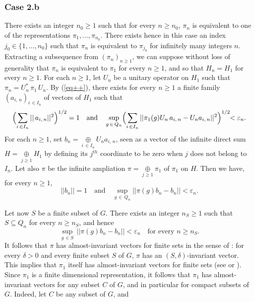 \documentclass[11pt,english,a4paper]{smfart}
\numberwithin{equation}{section}
\theoremstyle{definition}
\begin{document}
\subsubsection{Case 2.b}\label{Section 6.6.2} There exists an integer 
$n_{0}\ge 1$ such that for every 
 $n\ge n_{0}$, $\pi _{n}$ is equivalent to one of the representations
 $\pi _{1},\dots,\pi _{n_{0}}$. There exists hence in this case an index  $j_{0}\in\{1,\ldots, n_{0}\}$ such that $\pi_{n}$ is equivalent to $\pi_{j_{0}}$ for infinitely many integers $n$. Extracting a subsequence from $(\pi_{n})_{n\ge 1}$, we 
can suppose without loss of generality 
that $\pi _{n}$ is equivalent to $\pi _{1}$ for every $n\ge 1$, and so 
that $H_{n}=H_{1}$ for every ${n\ge 1}$. For each ${n\ge 1}$, let  
$U_{n}$ be a unitary operator  on $H_{1}$ such that $\pi _{n}
=U_{n}^{*}\,\pi _{1}^{}\,U_{n}^{}$. By (\ref{eq++}), there exists for every 
${n\ge 1}$ a finite family $(a_{i,\,n})_{i\,\in I_{n}}$ of vectors of 
$H_{1}$ 
such that 
\[
\Bigl(\sum_{i\,\in I_{n}}||\,a_{i,\,n}||^{2} 
\Bigr)^{1/2}=1\quad\textrm{and}\quad\sup_{g\,\in\,{Q_{n}}}
\Bigl(\sum_{i\,\in I_{n}}||\pi _{1}(g)U_{n}\,a_{i,\,n}-U_{n}a_{i,\,n} 
||^{2}\Bigr)^{1/2}\!\!<{\varepsilon _{n}}.
\]
For each ${n\ge 1}$, set $b_{n}={\mathop{\oplus}}\limits
_{i\,\in I_{n}} U_{n}a_{i,\,n}$, seen as a vector of the infinite direct 
sum
$H={\mathop{\oplus}}\limits_{j\ge 1}H_{1}$ by defining its $j^{th}$ coordinate to be zero when $j$ does not belong to $I_{n}$. Let also $\pi $ be the infinite ampliation 
$\pi ={\mathop{\oplus}}\limits_{j\ge 1}\pi _{1}$ of $\pi _{1}$ on $H$. Then we have, 
for every ${n\ge 1}$, 
\[
||b_{n}||=1\quad\textrm{and}\quad\sup_{g\,\in\,{Q_{n}}} ||\pi 
(g)b_{n}-b_{n}||<{\varepsilon _{n}}.
\]
\par\smallskip 
Let now $S$ be a finite subset of $G$. There exists an integer $n_{S}\ge 
1$ such that $S\subseteq {Q_{n}}$ for every $n\ge n_{S}$, and hence
\[
\sup_{g\,\in S}\,||\pi (g)b_{n}-b_{n}||<{\varepsilon _{n}}\quad\textrm{for every $n\ge 
n_{S}$.}
\]
It follows that $\pi $ has almost-invariant vectors for finite sets in the 
sense of \cite[Sec.~1.5]{Pet}: for every $\delta >0$ and every finite 
subset $S$ of $G$, $\pi $ has an $(S,\delta )$-invariant vector. This 
implies that $\pi _{1}$ itself has almost-invariant vectors for finite 
sets (see \cite[Sec.~1.5]{Pet} or \cite{Ke}). 
Since $\pi 
_{1}$ is a finite dimensional representation, it follows that $\pi _{1}$ 
has almost-invariant vectors for any subset $C$ of $G$, and in particular 
for compact subsets of $G$. Indeed, let $C$ be any subset of $G$, and 
\end{document}
